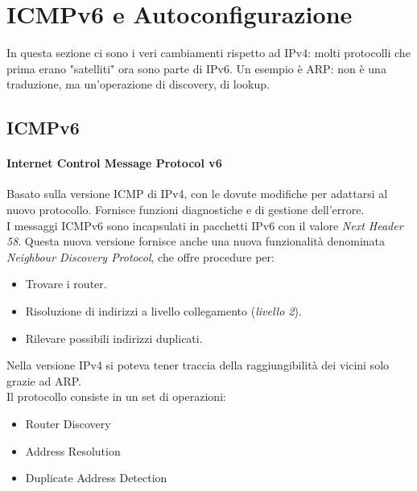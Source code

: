 \documentclass{article}
\begin{document}
\section{ICMPv6 e Autoconfigurazione}
In questa sezione ci sono i veri cambiamenti rispetto ad IPv4: molti protocolli che prima erano "satelliti" ora sono parte di IPv6. Un esempio è ARP: non è una traduzione, ma un'operazione di discovery, di lookup. 

\subsection{ICMPv6} 
\paragraph{Internet Control Message Protocol v6}
Basato sulla versione ICMP di IPv4, con le dovute modifiche per adattarsi al nuovo protocollo. Fornisce funzioni diagnostiche e di gestione dell'errore.\\
I messaggi ICMPv6 sono incapsulati in pacchetti IPv6 con il valore \textit{Next Header 58}. Questa nuova versione fornisce anche una nuova funzionalità denominata \textit{Neighbour Discovery Protocol}, che offre procedure per:
\begin{itemize}
    \item Trovare i router.
    \item Risoluzione di indirizzi a livello collegamento (\textit{livello 2}).
    \item Rilevare possibili indirizzi duplicati.
\end{itemize}
Nella versione IPv4 si poteva tener traccia della raggiungibilità dei vicini solo grazie ad ARP.\\ Il protocollo consiste in un set di operazioni:
\begin{itemize}
    \item Router Discovery
    \item Address Resolution
    \item Duplicate Address Detection
\end{itemize}
\end{document}
